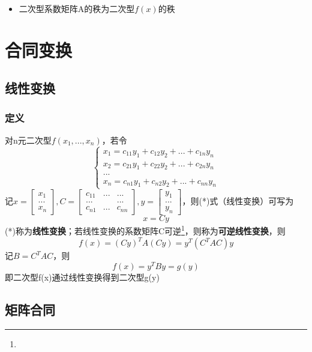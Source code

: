 \begin{itemize}
    \item 二次型系数矩阵A的秩为二次型\(f(x)\)的秩
\end{itemize}


\section{合同变换}

\subsection{线性变换}

\subsubsection{定义}

对n元二次型\(f(x_1, ..., x_n)\)，若令
\[\begin{cases}
    x_1 = c_{11}y_1 + c_{12}y_2 + ... + c_{1n}y_n \\ 
    x_2 = c_{21}y_1 + c_{22}y_2 + ... + c_{2n}y_n \\ 
    ... \\ 
    x_n = c_{n1}y_1 + c_{n2}y_2 + ... + c_{nn}y_n
\end{cases}\tag{*}\]
记\(x = \begin{bmatrix}
    x_1 \\ 
    ... \\ 
    x_n
\end{bmatrix}, C = \begin{bmatrix}
    c_{11} & ... & ... \\ 
    ... & & ... \\ 
    c_{n1} & ... & c_{nn}
\end{bmatrix}, y = \begin{bmatrix}
    y_1 \\ 
    ... \\ 
    y_n
\end{bmatrix}\)，则(*)式（线性变换）可写为\[x = Cy\]
(*)称为\textbf{线性变换}；若线性变换的系数矩阵C可逆\footnote{\mymatrix}，则称为\textbf{可逆线性变换}，则\[f(x) = (Cy)^TA(Cy) = y^T(C^TAC)y\]
记\(B = C^TAC\)，则\[f(x) = y^TBy = g(y)\]
即二次型f(x)通过线性变换得到二次型g(y)


\subsection{矩阵合同}


